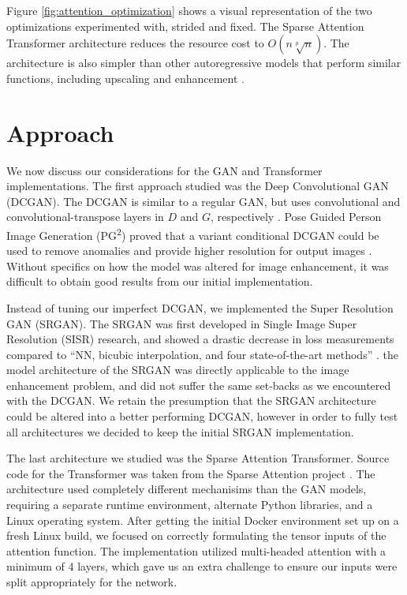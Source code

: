 \documentclass[letterpaper]{article} %
\begin{document}
Figure \ref{fig:attention_optimization} shows a visual representation of
the two optimizations experimented with, strided and fixed.
The Sparse Attention Transformer architecture reduces the resource cost to
$O(n\sqrt[p]{n})$.
The architecture is also simpler than other autoregressive models that perform
similar functions, including upscaling and enhancement \cite{pixel_subscale}.

\section{Approach}
We now discuss our considerations for the GAN and Transformer implementations.
The first approach studied was the
Deep Convolutional GAN (DCGAN).
The DCGAN
is similar to a regular GAN,
but uses convolutional and convolutional-transpose layers in $D$ and $G$, respectively
\cite{unsupervised_learning}.
Pose Guided Person Image Generation (PG\textsuperscript{2})
proved that a variant conditional DCGAN could be used to
remove anomalies and provide higher resolution for output images
\cite{pose_guided_image_generation}.
Without specifics on how the model was altered for image enhancement,
it was difficult to obtain good results from our initial implementation.

Instead of tuning our imperfect DCGAN, we implemented the
Super Resolution GAN (SRGAN).
The SRGAN was first developed in
Single Image Super Resolution (SISR) research, and showed a drastic decrease in loss measurements
compared to ``NN, bicubic interpolation, and four state-of-the-art methods''
\cite{srgan}.
the model architecture of the SRGAN was directly applicable to the image enhancement problem,
and did not suffer the same set-backs as we encountered with the DCGAN.
We retain the presumption that the SRGAN architecture could be altered into a better performing DCGAN,
however in order to fully test all architectures we decided to keep the initial SRGAN implementation.

The last architecture we studied was the Sparse Attention Transformer.
Source code for the Transformer was
taken from the Sparse Attention project \cite{generative_transformers}.
The architecture used completely different mechanisims than the GAN models,
requiring a separate runtime environment, alternate Python libraries, and a Linux operating system.
After getting the initial Docker environment set up on a fresh Linux build,
we focused on correctly formulating the tensor inputs of the attention function.
The implementation utilized multi-headed attention with a minimum of 4 layers,
which gave us an extra challenge to ensure our inputs were split appropriately for the network.
\end{document}
